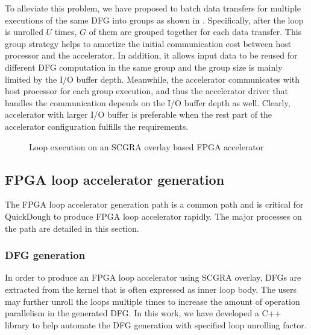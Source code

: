 To alleviate this problem, we have proposed to batch data transfers for multiple executions of the same DFG into groups as shown in . Specifically, after the loop is unrolled $U$ times, $G$ of them are grouped together for each data transfer. This group strategy helps to amortize the initial communication cost between host processor and the accelerator. In addition, it allows input data to be reused for different DFG computation in the same group and the group size is mainly limited by the I/O buffer depth. Meanwhile, the accelerator communicates with host processor for each group execution, and thus the accelerator driver that handles the communication depends on the I/O buffer depth as well. Clearly, accelerator with larger I/O buffer is preferable when the rest part of the accelerator configuration fulfills the requirements. 

\begin{figure}
\vspace{-1em}
\caption{Loop execution on an SCGRA overlay based FPGA accelerator}
\label{fig:blocking-and-dfg-gen}
\vspace{-1.2em}
\end{figure}

\subsection{FPGA loop accelerator generation}
The FPGA loop accelerator generation path is a common path and is critical for QuickDough to produce
FPGA loop accelerator rapidly. The major processes on the path are detailed in this section.

\subsubsection{DFG generation}
In order to produce an FPGA loop accelerator using SCGRA overlay, DFGs are extracted from the kernel
that is often expressed as inner loop body. The users may further unroll the loops multiple times to
increase the amount of operation parallelism in the generated DFG. In this work, we have developed a
C++ library to help automate the DFG generation with specified loop unrolling factor.

